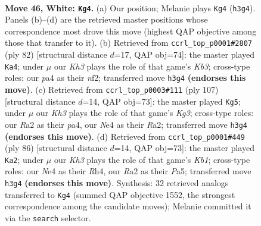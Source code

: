 \documentclass[11pt]{article}
\begin{document}
\clearpage

\begin{figure}[p]\centering
\begin{subfigure}{0.46\textwidth}\centering
\resizebox{\linewidth}{!}{%
\newchessgame
\chessboard[
  setfen={7r/4k3/8/1b2p3/pP2N3/6PK/R7/8 w - - 5 46},
  showmover=false,
  pgfstyle=straightmove, color=movearrow, markmove={h3-g4}
]}
\caption{}
\end{subfigure}\hfill
\begin{subfigure}{0.46\textwidth}\centering
\resizebox{\linewidth}{!}{%
\newchessgame
\chessboard[
  setfen={5k2/8/p1N5/8/1P6/1K4r1/5n2/4R3 w - - 0 42},
  showmover=false,
  pgfstyle=straightmove, color=movearrow, markmove={b3-a4}
]}
\caption{}
\end{subfigure}
\\[4pt]
\begin{subfigure}{0.46\textwidth}\centering
\resizebox{\linewidth}{!}{%
\newchessgame
\chessboard[
  setfen={8/8/1R4k1/5p1p/P7/4P1P1/r7/4K3 b - - 5 54},
  showmover=false,
  pgfstyle=straightmove, color=movearrow, markmove={g6-g5}
]}
\caption{}
\end{subfigure}\hfill
\begin{subfigure}{0.46\textwidth}\centering
\resizebox{\linewidth}{!}{%
\newchessgame
\chessboard[
  setfen={8/k1p4p/2p5/P7/7R/8/1PP5/1K4r1 w - - 2 44},
  showmover=false,
  pgfstyle=straightmove, color=movearrow, markmove={b1-a2}
]}
\caption{}
\end{subfigure}
\caption{\textbf{Move 46, White: \texttt{Kg4}.} (a) Our position; Melanie plays \texttt{Kg4} (\texttt{h3g4}). Panels (b)--(d) are the retrieved master positions whose correspondence most drove this move (highest QAP objective among those that transfer to it). (b) Retrieved from \texttt{ccrl\_top\_p0001\#2807} (ply 82) [structural distance $d$=17, QAP obj=74]: the master played \texttt{Ka4}; under $\mu$ our \emph{Kh3} plays the role of that game's \emph{Kb3}; cross-type roles: our \emph{p}a4 as their \emph{n}f2; transferred move \texttt{h3g4} \textbf{(endorses this move)}. (c) Retrieved from \texttt{ccrl\_top\_p0003\#111} (ply 107) [structural distance $d$=14, QAP obj=73]: the master played \texttt{Kg5}; under $\mu$ our \emph{Kh3} plays the role of that game's \emph{Kg3}; cross-type roles: our \emph{R}a2 as their \emph{p}a4, our \emph{N}e4 as their \emph{R}a2; transferred move \texttt{h3g4} \textbf{(endorses this move)}. (d) Retrieved from \texttt{ccrl\_top\_p0001\#449} (ply 86) [structural distance $d$=14, QAP obj=73]: the master played \texttt{Ka2}; under $\mu$ our \emph{Kh3} plays the role of that game's \emph{Kb1}; cross-type roles: our \emph{N}e4 as their \emph{R}h4, our \emph{R}a2 as their \emph{P}a5; transferred move \texttt{h3g4} \textbf{(endorses this move)}. Synthesis: 32 retrieved analogs transferred to \texttt{Kg4} (summed QAP objective 1552, the strongest correspondence among the candidate moves); Melanie committed it via the \texttt{search} selector.}
\label{fig:thought-m90}
\end{figure}
\end{document}
